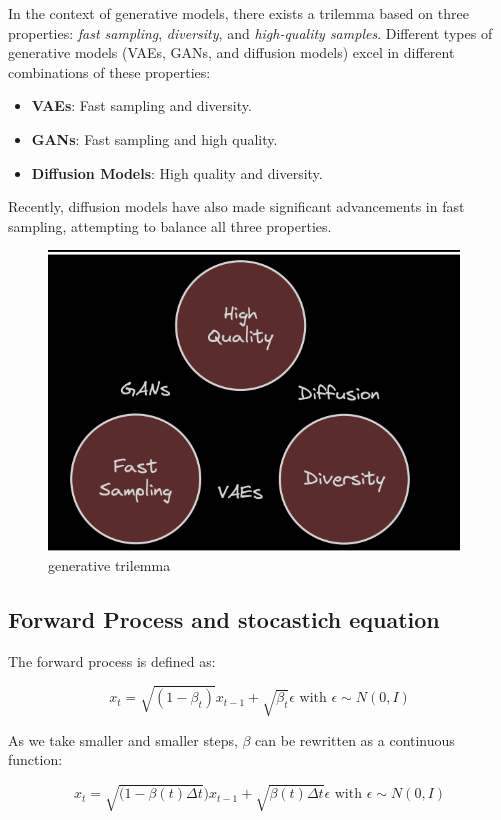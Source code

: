 In the context of generative models, there exists a trilemma based on three properties: \textit{fast sampling}, \textit{diversity}, and \textit{high-quality samples}. Different types of generative models (VAEs, GANs, and diffusion models) excel in different combinations of these properties:

\begin{itemize}
    \item \textbf{VAEs}: Fast sampling and diversity.
    \item \textbf{GANs}: Fast sampling and high quality.
    \item \textbf{Diffusion Models}: High quality and diversity.
\end{itemize}

Recently, diffusion models have also made significant advancements in fast sampling, attempting to balance all three properties.

\begin{figure}[H]
    \centering
    \includegraphics[width=0.75\linewidth]{tikz/Generative trilemma.png}
    \caption{generative trilemma}
    \label{fig:generative-trilemma}
\end{figure}

\subsection{Forward Process and stocastich equation}

The forward process is defined as:

$$x_t = \sqrt{(1- \beta_t)}x_{t-1} + \sqrt{\beta_t}\epsilon \text{ with } \epsilon \sim N(0,I)$$

As we take smaller and smaller steps, $\beta$ can be rewritten as a continuous function:

$$x_t = \sqrt{(1- \beta(t)\Delta t})x_{t-1} + \sqrt{\beta(t)\Delta t}\epsilon \text{ with } \epsilon \sim N(0,I)$$

